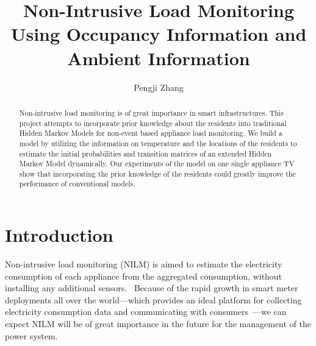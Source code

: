 \documentclass[sigconf]{acmart}
\begin{document}
\title{Non-Intrusive Load Monitoring Using Occupancy Information and
  Ambient Information}

\author{Pengji Zhang}

\begin{abstract}
  Non-intrusive load monitoring is of great importance in smart
  infrastructures. This project attempts to incorporate prior
  knowledge about the residents into traditional Hidden Markov Models
  for non-event based appliance load monitoring. We build a model by
  utilizing the information on temperature and the locations of the
  residents to estimate the initial probabilities and transition
  matrices of an extended Hidden Markov Model dynamically. Our
  experiments of the model on one single appliance TV show that
  incorporating the prior knowledge of the residents could greatly
  improve the performance of conventional models.
\end{abstract}


\maketitle

\section{Introduction}

Non-intrusive load monitoring (NILM) is aimed to estimate the
electricity consumption of each appliance from the aggregated
consumption, without installing any additional
sensors.~\cite{hart1992nonintrusive} Because of the rapid growth in
smart meter deployments all over the world---which provides an ideal
platform for collecting electricity consumption data and communicating
with consumers~\cite{kim2011unsupervised, parson2012non}---we can
expect NILM will be of great importance in the future for the
management of the power system.~\cite{kim2011unsupervised}
\end{document}
